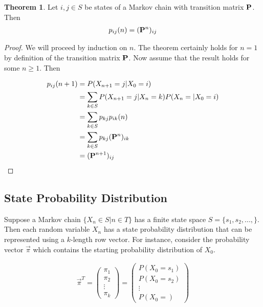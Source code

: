 \documentclass[a4paper,12pt]{article}
\theoremstyle{definition}
\newtheorem{theorem}{Theorem}[subsection]
\let\oldtextbf\mathbf
\renewcommand{\mathbf}[1]{\oldtextbf{\boldmath #1}}
\begin{document}
	\begin{theorem}
		Let $i, j \in S$ be states of a Markov chain with transition matrix $\mathbf{P}$. Then
		\begin{equation*}
		\begin{aligned}
			p_{ij}(n) = (\mathbf{P}^n)_{ij}
		\end{aligned}
		\end{equation*}	
	\end{theorem}
	\begin{proof}
		We will proceed by induction on $n$. The theorem certainly holds for $n=1$ by definition of the transition matrix $\mathbf{P}$.
		Now assume that the result holds for some $n \geq 1$. Then

		\begin{equation*}
		\begin{aligned}
			p_{ij}(n+1) &= P(X_{n+1} = j|X_0 = i) \\
					&= \sum_{k \in S} P(X_{n+1} = j|X_{n} = k)P(X_{n} = | X_0 = i) \\
					&= \sum_{k \in S} p_{kj}p_{ik}(n) \\
					&= \sum_{k \in S} p_{kj}(\mathbf{P}^{n})_{ik} \\
					&= (\mathbf{P}^{n+1})_{ij} 
		\end{aligned}
		\end{equation*}	
	\end{proof}
	
\subsection{State Probability Distribution}

Suppose a Markov chain $\{X_n \in S|n \in T\}$ has a finite state space $S = \{s_1, s_2,...,\}$. Then each random 
variable $X_n$ has a state probability distribution that can be represented using a $k$-length row vector. For instance, 
consider the probability vector $\vec{\pi}$ which contains the starting probability distribution of $X_0$.
	
	\begin{equation*}
	\begin{aligned}
		\vec{\pi}^T = \begin{pmatrix}
		 \pi_1 \\
		 \pi_2 \\ 
		 \vdots \\
		 \pi_k
		 \end{pmatrix} = \begin{pmatrix}
		 P(X_0 = s_1) \\
		 P(X_0 = s_2) \\ 
		 \vdots \\
		 P(X_0 =)
		 \end{pmatrix}
	\end{aligned}
	\end{equation*}		
	
\end{document}
